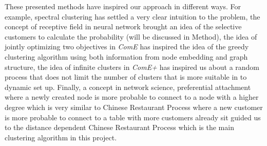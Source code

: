 These presented methods have inspired our approach in different ways. For example, spectral clustering has settled a very clear intuition to the problem, the concept of receptive field in neural network brought an idea of the selective customers to calculate the probability (will be discussed in Method), the idea of jointly optimizing two objectives in \emph{ComE} has inspired the idea of the greedy clustering algorithm using both information from node embedding and graph structure, the idea of infinite clusters in \emph{ComE+} has inspired us about a random process that does not limit the number of clusters that is more suitable in to dynamic set up. Finally, a concept in network science, preferential attachment where a newly created node is more probable to connect to a node with a higher degree which is very similar to Chinese Restaurant Process where a new customer is more probable to connect to a table with more customers already sit guided us to the distance dependent Chinese Restaurant Process which is the main clustering algorithm in this project.